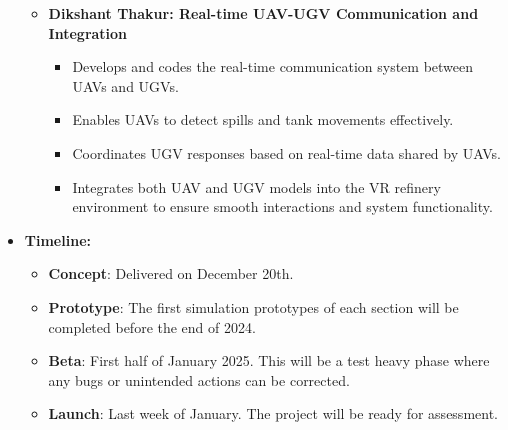\documentclass{article}
\begin{document}
\begin{itemize}
\begin{itemize}
        \item \textbf{Dikshant Thakur: Real-time UAV-UGV Communication and Integration}
        \begin{itemize}
            \item Develops and codes the real-time communication system between UAVs and UGVs.
            \item Enables UAVs to detect spills and tank movements effectively.
            \item Coordinates UGV responses based on real-time data shared by UAVs.
            \item Integrates both UAV and UGV models into the VR refinery environment to ensure smooth interactions and system functionality.
        \end{itemize}
    \end{itemize}
    \item \textbf{Timeline:} 
        \begin{itemize}
        \item \textbf{Concept}: Delivered on December 20th.
        \item \textbf{Prototype}: The first simulation prototypes of each section will be completed before the end of 2024.
        \item \textbf{Beta}: First half of January 2025. This will be a test heavy phase where any bugs or unintended actions can be corrected.
        \item \textbf{Launch}: Last week of January. The project will be ready for assessment.
        \end{itemize}
\end{itemize}




%
%
%
%

%
%
%
%




\nocite{*}
\end{document}
